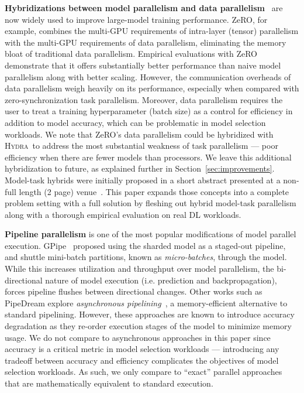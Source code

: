 \documentclass{article}
\newcommand{\system}{\textsc{Hydra}}
\begin{document}
\textbf{Hybridizations between model parallelism and data parallelism}~\cite{zeroDeep,zeroOpt,zeroInfinity} are now widely used to improve large-model training performance. ZeRO, for example, combines the multi-GPU requirements of intra-layer (tensor) parallelism with the multi-GPU requirements of data parallelism, eliminating the memory bloat of traditional data parallelism. Empirical evaluations with ZeRO demonstrate that it offers substantially better performance than naive model parallelism along with better scaling. However, the communication overheads of data parallelism weigh heavily on its performance, especially when compared with zero-synchronization task parallelism. Moreover, data parallelism requires the user to treat a training hyperparameter (batch size) as a control for efficiency in addition to model accuracy, which can be problematic in model selection workloads. We note that ZeRO's data parallelism could be hybridized with \system~to address the most substantial weakness of task parallelism --- poor efficiency when there are fewer models than processors. We leave this additional hybridization to future, as explained further in Section~\ref{sec:improvements}. Model-task hybrids were initially proposed in a short abstract presented at a non-full length (2 page) venue~\cite{hydra_cerebro}. 
This paper expands those concepts into a complete problem setting with a full solution by fleshing out hybrid model-task parallelism along with a thorough empirical evaluation on real DL workloads.

\textbf{Pipeline parallelism} is one of the most popular modifications of model parallel execution. GPipe~\cite{gpipe} proposed using the sharded model as a staged-out pipeline, and shuttle mini-batch partitions, known as \textit{micro-batches}, through the model. While this increases utilization and throughput over model parallelism, the bi-directional nature of model execution (i.e. prediction and backpropagation), forces pipeline flushes between directional changes. Other works such as PipeDream explore \textit{asynchronous pipelining}~\cite{harlapPipeline,narayanan2021memoryefficient,yang2020pipemare,gaunt2017ampnet,li2021chimera,shoeybi2019megatron,narayanan2021efficient}, a memory-efficient alternative to standard pipelining. However, these approaches are known to introduce accuracy degradation as they re-order execution stages of the model to minimize memory usage. We do not compare to asynchronous approaches in this paper since accuracy is a critical metric in model selection workloads --- introducing any tradeoff between accuracy and efficiency complicates the objectives of model selection workloads. As such, we only compare to ``exact'' parallel approaches that are mathematically equivalent to standard execution. 
\end{document}
